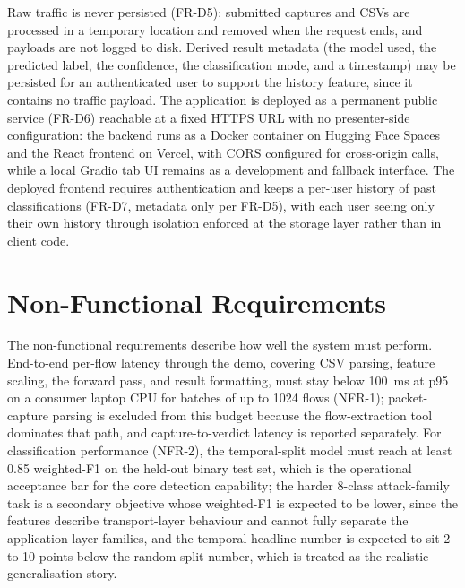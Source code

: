 \par Raw traffic is never persisted (FR-D5): submitted captures and CSVs are processed in a temporary location and removed when the request ends, and payloads are not logged to disk. Derived result metadata (the model used, the predicted label, the confidence, the classification mode, and a timestamp) may be persisted for an authenticated user to support the history feature, since it contains no traffic payload. The application is deployed as a permanent public service (FR-D6) reachable at a fixed HTTPS URL with no presenter-side configuration: the backend runs as a Docker container on Hugging Face Spaces and the React frontend on Vercel, with CORS configured for cross-origin calls, while a local Gradio tab UI remains as a development and fallback interface. The deployed frontend requires authentication and keeps a per-user history of past classifications (FR-D7, metadata only per FR-D5), with each user seeing only their own history through isolation enforced at the storage layer rather than in client code.

\section{Non-Functional Requirements}
\label{sec:non_functional_requirements}

\par The non-functional requirements describe how well the system must perform. End-to-end per-flow latency through the demo, covering CSV parsing, feature scaling, the forward pass, and result formatting, must stay below 100~ms at p95 on a consumer laptop CPU for batches of up to 1024 flows (NFR-1); packet-capture parsing is excluded from this budget because the flow-extraction tool dominates that path, and capture-to-verdict latency is reported separately. For classification performance (NFR-2), the temporal-split model must reach at least 0.85 weighted-F1 on the held-out binary test set, which is the operational acceptance bar for the core detection capability; the harder 8-class attack-family task is a secondary objective whose weighted-F1 is expected to be lower, since the features describe transport-layer behaviour and cannot fully separate the application-layer families, and the temporal headline number is expected to sit 2 to 10 points below the random-split number, which is treated as the realistic generalisation story.


